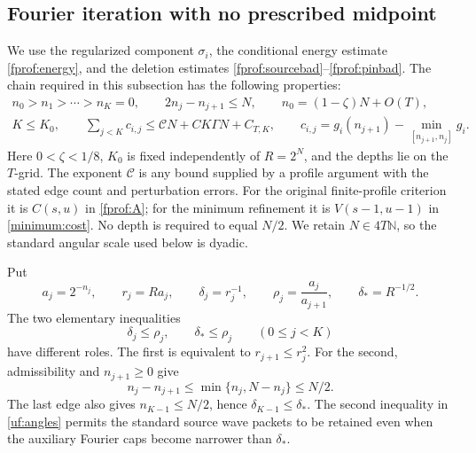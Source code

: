\subsection{Fourier iteration with no prescribed midpoint}
\label{uf:transfer}

We use the regularized component \(\sigma_i\), the conditional energy
estimate \eqref{fprof:energy}, and the deletion estimates
\eqref{fprof:sourcebad}--\eqref{fprof:pinbad}. The chain required in this
subsection has the following properties:
\begin{gather}\label{uf:chain}
 n_0>n_1>\cdots>n_K=0,\qquad 2n_j-n_{j+1}\leq N,\qquad
 n_0=(1-\zeta)N+O(T),\\
 K\leq K_0,\qquad
 \sum_{j<K}c_{i,j}\leq\mathcal C N+C K\Gamma N+C_{T,K},\qquad
 c_{i,j}=g_i(n_{j+1})-\min_{[n_{j+1},n_j]}g_i.\nonumber
\end{gather}
Here \(0<\zeta<1/8\), \(K_0\) is fixed independently of \(R=2^N\),
and the depths lie on the \(T\)-grid. The exponent \(\mathcal C\) is any
bound supplied by a profile argument with the stated edge count and
perturbation errors. For the original finite-profile criterion it is
\(C(s,u)\) in \eqref{fprof:A}; for the minimum refinement it is
\(V(s-1,u-1)\) in \eqref{minimum:cost}. No depth is required to equal
\(N/2\). We retain \(N\in4T\mathbb N\), so the standard angular scale
used below is dyadic.

Put
$$
 a_j=2^{-n_j},\qquad r_j=Ra_j,\qquad
 \delta_j=r_j^{-1},\qquad
 \rho_j=\frac{a_j}{a_{j+1}},\qquad
 \delta_*=R^{-1/2}.
$$
The two elementary inequalities
\begin{equation}\label{uf:angles}
 \delta_j\leq\rho_j,\qquad \delta_*\leq\rho_j
 \qquad(0\leq j<K)
\end{equation}
have different roles. The first is equivalent to
\(r_{j+1}\leq r_j^2\). For the second, admissibility and
\(n_{j+1}\geq0\) give
$$
 n_j-n_{j+1}\leq\min\{n_j,N-n_j\}\leq N/2.
$$
The last edge also gives \(n_{K-1}\leq N/2\), hence
\(\delta_{K-1}\leq\delta_*\). The second inequality in
\eqref{uf:angles} permits the standard source wave packets to be retained
even when the auxiliary Fourier caps become narrower than \(\delta_*\).

